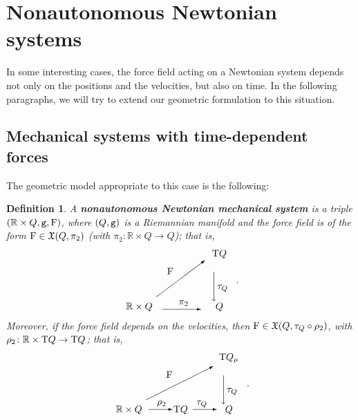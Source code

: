 \documentclass[12pt]{report}
\newtheorem{definition}[teor]{Definition}
\def\vf{\mathfrak X}
\def\Real{\mathbb{R}}
\def\Tan{{\rm T}}
\begin{document}
\section{Nonautonomous Newtonian systems}


In some interesting cases, the force field acting on a Newtonian system 
depends not only on the positions and the velocities, but also on time. 
In the following paragraphs, we will try to extend our geometric formulation to this situation. 


\subsection{Mechanical systems with time-dependent forces}


The geometric model appropriate to this case is the following:

\begin{definition}
A {\sl \textbf{nonautonomous Newtonian mechanical system}} is a triple
 $(\Real\times Q,{\tt g},{\rm F})$, where
$(Q,{\tt g})$ is a Riemannian manifold and the force field is of the form 
${\rm F}\in\vf (Q,\pi_2)$ (with $\pi_2\colon\Real\times Q\to Q$); that is,
$$
\begin{array}{ccc}
& &\Tan Q \\
&
\begin{picture}(40,30)(0,0)
\put(5,15){\mbox{${\rm F}$}}
\put(-6,-8){\vector(4,3){50}}
\end{picture}
&
\Bigg\downarrow \tau_Q
\\
\Real\times Q
&
\begin{picture}(40,5)(0,0)
\put(17,5){\mbox{$\pi_2$}}
\put(0,0){\vector(1,0){40}}
\end{picture}
& Q
\end{array} \ .
$$
Moreover, if the force field depends on the velocities, then 
${\rm F}\in\vf (Q,\tau_Q\circ\rho_2)$, with $\rho_2\colon\Real\times\Tan Q\to \Tan Q$;
that is,
$$
\begin{array}{ccc}
& &\Tan Q_\mu \\
&
\begin{picture}(60,30)(0,0)
\put(15,15){\mbox{${\rm F}$}}
\put(-6,-8){\vector(2,1){70}}
\end{picture}
&
\Bigg\downarrow \tau_Q
\\
\Real\times Q
&
\begin{picture}(20,5)(0,0)
\put(3,8){\mbox{$\rho_2$}}
\put(-6,3){\vector(1,0){25}}
\end{picture}
\Tan Q
\begin{picture}(20,5)(0,0)
\put(9,8){\mbox{$\tau_Q$}}
\put(5,3){\vector(1,0){25}}
\end{picture}
& Q
\end{array}\ . 
$$
\end{definition}
\end{document}
